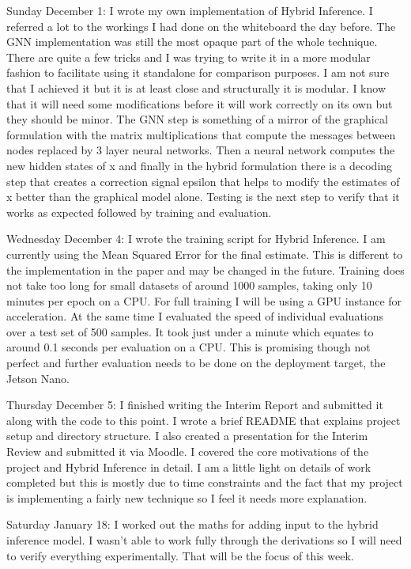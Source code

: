 \documentclass[]{../resources/final_report}
\begin{document}
\begin{appendices}
  Sunday December 1: I wrote my own implementation of Hybrid Inference. I referred a lot to the workings I had done on the whiteboard the day before. The GNN implementation was still the most opaque part of the whole technique. There are quite a few tricks and I was trying to write it in a more modular fashion to facilitate using it standalone for comparison purposes. I am not sure that I achieved it but it is at least close and structurally it is modular. I know that it will need some modifications before it will work correctly on its own but they should be minor. The GNN step is something of a mirror of the graphical formulation with the matrix multiplications that compute the messages between nodes replaced by 3 layer neural networks. Then a neural network computes the new hidden states of x and finally in the hybrid formulation there is a decoding step that creates a correction signal epsilon that helps to modify the estimates of x better than the graphical model alone. Testing is the next step to verify that it works as expected followed by training and evaluation.

  Wednesday December 4: I wrote the training script for Hybrid Inference. I am currently using the Mean Squared Error for the final estimate. This is different to the implementation in the paper and may be changed in the future. Training does not take too long for small datasets of around 1000 samples, taking only 10 minutes per epoch on a CPU. For full training I will be using a GPU instance for acceleration. At the same time I evaluated the speed of individual evaluations over a test set of 500 samples. It took just under a minute which equates to around 0.1 seconds per evaluation on a CPU. This is promising though not perfect and further evaluation needs to be done on the deployment target, the Jetson Nano.

  Thursday December 5: I finished writing the Interim Report and submitted it along with the code to this point. I wrote a brief README that explains project setup and directory structure. I also created a presentation for the Interim Review and submitted it via Moodle. I covered the core motivations of the project and Hybrid Inference in detail. I am a little light on details of work completed but this is mostly due to time constraints and the fact that my project is implementing a fairly new technique so I feel it needs more explanation.

  Saturday January 18: I worked out the maths for adding input to the hybrid inference model. I wasn’t able to work fully through the derivations so I will need to verify everything experimentally. That will be the focus of this week.


\end{appendices}
\end{document}

